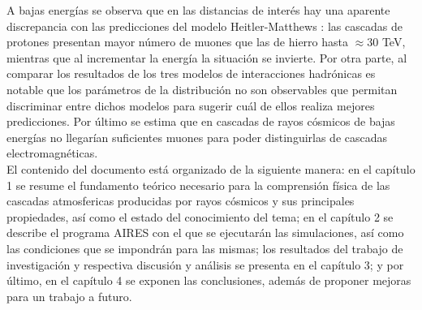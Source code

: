 A bajas energ\'ias se observa que en las distancias de inter\'es hay una aparente discrepancia con las predicciones del modelo Heitler-Matthews \cite{Matthews2005}: las cascadas de protones presentan mayor n\'umero de muones que las de hierro hasta $\approx 30$ TeV, mientras que al incrementar la energ\'ia la situaci\'on se invierte. Por otra parte, al comparar los resultados de los tres modelos de interacciones hadr\'onicas es notable que los par\'ametros de la distribuci\'on no son observables que permitan discriminar entre dichos modelos para sugerir cu\'al de ellos realiza mejores predicciones. Por \'ultimo se estima que en cascadas de rayos c\'osmicos de bajas energ\'ias no llegar\'ian suficientes muones para poder distinguirlas de cascadas electromagn\'eticas.\\

El contenido del documento est\'a organizado de la siguiente manera: en el capítulo 1 se resume el fundamento teórico necesario para la comprensión física de las cascadas atmosfericas producidas por rayos cósmicos y sus principales propiedades, así como el estado del conocimiento del tema; en el capítulo 2 se describe el programa AIRES con el que se ejecutar\'an las simulaciones, así como las condiciones que se impondr\'an para las mismas; los resultados del trabajo de investigaci\'on y respectiva discusi\'on y an\'alisis se presenta en el cap\'itulo 3; y por \'ultimo, en el cap\'itulo 4 se exponen las conclusiones, adem\'as de proponer mejoras para un trabajo a futuro.

\singlespacing